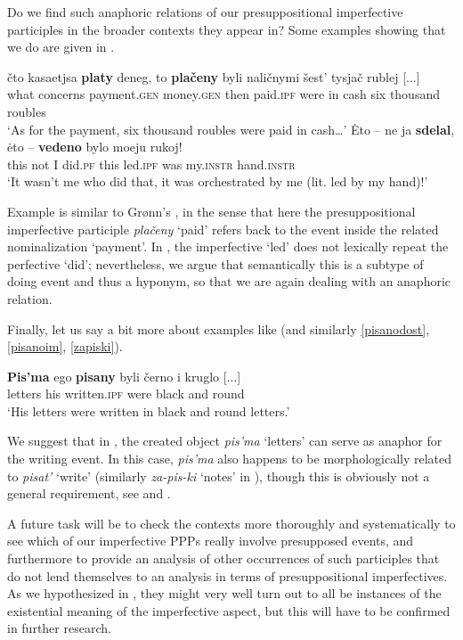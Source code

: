 \documentclass[output=paper,modfonts,newtxmath,hidelinks
]{langscibook}
\begin{document}
Do we  find such anaphoric relations of our presuppositional imperfective participles in the broader contexts they appear in? Some examples showing that we do are given in .

\ea\label{anaphOF}
\ea\gll 	čto kasaetjsa \textbf{platy} deneg, to \textbf{plačeny} byli naličnymi šest' tysjač rublej [...]\\
	what concerns payment.\textsc{gen} money.\textsc{gen} then paid.\textsc{ipf} were {in cash} six thousand roubles\\
\glt	`As for the payment, six thousand roubles were paid in cash\dots'\label{platy}
\ex\gll 	\.{E}to -- ne ja \textbf{sdelal}, \.{e}to -- \textbf{vedeno} bylo moeju rukoj!\\
	this {} not I did.\textsc{pf} this {} led.\textsc{ipf} was my.\textsc{instr} hand.\textsc{instr}\\
\glt	`It wasn't me who did that, it was orchestrated by me (lit. led by my hand)!'\label{rukoj}	
\z\z

\noindent Example  is similar to Grønn's , in the sense that here the presuppositional imperfective participle \textit{plačeny} `paid' refers back to the event inside the related nominalization `payment'. In , the imperfective `led' does not lexically repeat the perfective `did'; nevertheless, we argue that semantically this is a subtype of doing event and thus a hyponym, so that we are again dealing with an anaphoric relation. 

Finally, let us say a bit more about examples like  (and similarly \ref{pisanodost}, \ref{pisanoim}, \ref{zapiski}). 

\ea\gll	\textbf{Pis'ma} ego \textbf{pisany} byli černo i kruglo [...]\\
	letters his written.\textsc{ipf} were black and round \\
\glt	`His letters were written in black and round letters.'\label{kruglo}
\z

\noindent We suggest that in , the created object \textit{pis'ma} `letters' can serve as anaphor for the writing event. In this case, \textit{pis'ma} also happens to be morphologically related to \textit{pisat'} `write' (similarly \textit{za-pis-ki} `notes' in ), though this is obviously not a general requirement, see   and .

A future task will be to check the contexts more thoroughly and systematically to see which of our imperfective PPPs really involve presupposed events, and furthermore to provide an analysis of other occurrences of such participles that do not lend themselves to an analysis in terms of presuppositional imperfectives. As we hypothesized in , they might very well turn out to all be instances of the existential meaning of the imperfective aspect, but this will have to be confirmed in further research.
\end{document}
